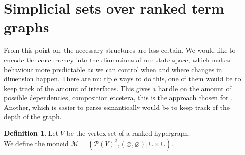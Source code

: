 \documentclass[12pt]{article}
\newtheorem{corollary}[theorem]{Corollary}
\theoremstyle{definition}
\newtheorem{definition}[theorem]{Definition}
\newcommand{\defeq}{\vcentcolon=}
\renewcommand{\P}{\mathcal{P}}
\newcommand{\1}{\mathbbm{1}}
\renewcommand{\L}{\mathcal{L}}
\newcommand{\M}{\mathcal{M}}
\newcommand{\seq}{;}
\begin{document}



    


\newpage
\section{Simplicial sets over ranked term graphs}
From this point on, the necessary structures are less certain. We would like to encode the concurrency into the dimensions of our state space, which makes behaviour more predictable as we can control when and where changes in dimension happen. There are multiple ways to do this, one of them would be to keep track of the amount of interfaces. This gives a handle on the amount of possible dependencies, composition etcetera, this is the approach chosen for . Another, which is easier to parse semantically would be to keep track of the depth of the graph. 

\begin{definition}
    Let $V$ be the vertex set of a ranked hypergraph.\\
    We define the monoid $\M = (\P(V)^2, (\varnothing, \varnothing), \cup\times\cup)$. 
\end{definition}
\end{document}
